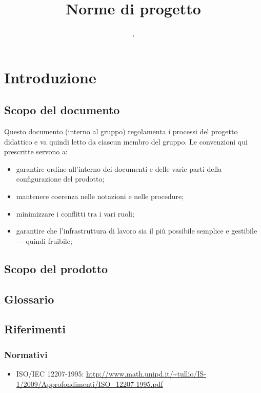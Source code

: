 


\author{\GG, \MM}
\supervisor{\LB, \AZ}
\title{Norme di progetto}


\maketitle

\tableofcontents

\section{Introduzione}

\subsection{Scopo del documento}
Questo documento (interno al gruppo) regolamenta i processi del progetto didattico e va quindi letto da ciascun membro del gruppo. Le convenzioni qui prescritte servono a:
\begin{itemize}
	\item garantire ordine all'interno dei documenti e delle varie parti della configurazione del prodotto;
	\item mantenere coerenza nelle notazioni e nelle procedure;
	\item minimizzare i conflitti tra i vari ruoli;
	\item garantire che l'infrastruttura di lavoro sia il più possibile semplice e gestibile --- quindi fruibile;
\end{itemize}

\subsection{Scopo del prodotto}
\scopo %

	\subsection{Glossario}
	\subsection{Riferimenti}
		\subsubsection{Normativi}
		\begin{itemize}
		\item ISO/IEC 12207-1995: \url{http://www.math.unipd.it/\~tullio/IS-1/2009/Approfondimenti/ISO_12207-1995.pdf}
		\end{itemize}
